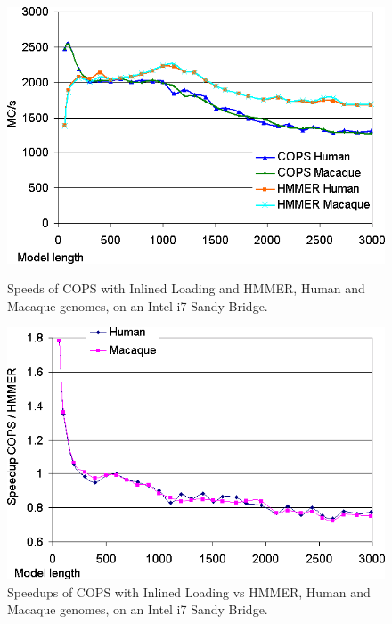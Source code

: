 \begin{figure}[H]
    \begin{minipage}{0.48\linewidth}
		\centering
		\includegraphics[scale=0.46]{graphics/inlined-larissa-runtimes.png}
		\caption[Speeds of COPS with Inlined Loading and HMMER on an Intel i7 Sandy Bridge] 
		{Speeds of COPS with Inlined Loading and HMMER, Human and Macaque genomes, on an Intel i7 Sandy Bridge.}
		\label{inlined-larissa-runtimes}
    \end{minipage}
    \hspace{0.04\linewidth}
    \begin{minipage}{0.48\linewidth}
		\centering
		\includegraphics[scale=0.46]{graphics/inlined-larissa-speedups.png}
		\caption[Speedups of COPS with Inlined Loading and HMMER on an Intel i7 Sandy Bridge]
		{Speedups of COPS with Inlined Loading vs HMMER, Human and Macaque genomes, on an Intel i7 Sandy Bridge.}
		\label{inlined-larissa-speedups}
    \end{minipage}
\end{figure} 

